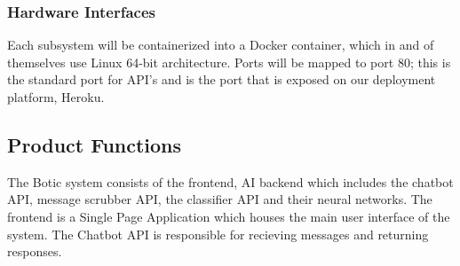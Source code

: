 \documentclass[11pt]{article}
\begin{document}


\subsubsection{Hardware Interfaces}

Each subsystem will be containerized into a Docker container, which in and of themselves use Linux 64-bit architecture. 
Ports will be mapped to port 80; this is the standard port for API's and is the port that is exposed on our deployment platform, Heroku.




\subsection{Product Functions}%

The Botic system consists of the frontend, AI backend which includes the chatbot API, message scrubber API, the classifier API and their neural networks. The frontend is a Single Page Application which houses the main user interface of the system. The Chatbot API is responsible for recieving messages and returning responses.\par
\end{document}

